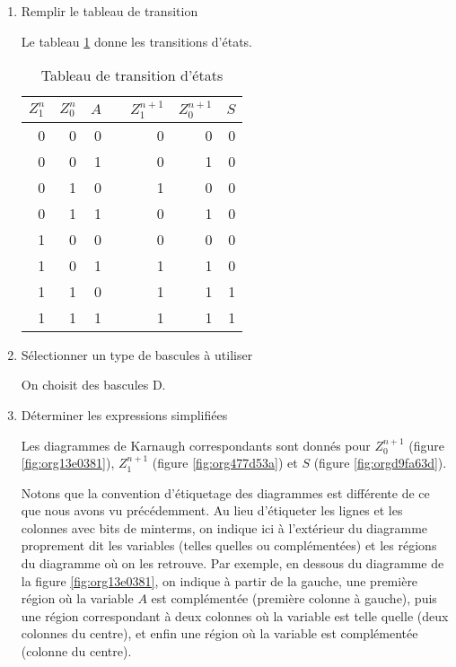 \documentclass[letter, oneside]{book}
\begin{document}
\begin{enumerate}
\begin{enumerate}
\item Remplir le tableau de transition
\label{sec:orgc6b1f28}

Le tableau \ref{tab:orgb36fc17} donne les transitions d'états. 

\begin{table}[htbp]
\caption{\label{tab:orgb36fc17}Tableau de transition d'états}
\centering
\begin{tabular}{rrrlrrr}
\(Z_1^n\) & \(Z_0^n\) & \(A\) &  & \(Z_1^{n+1}\) & \(Z_0^{n+1}\) & \(S\)\\[0pt]
\hline
0 & 0 & 0 &  & 0 & 0 & 0\\[0pt]
0 & 0 & 1 &  & 0 & 1 & 0\\[0pt]
0 & 1 & 0 &  & 1 & 0 & 0\\[0pt]
0 & 1 & 1 &  & 0 & 1 & 0\\[0pt]
1 & 0 & 0 &  & 0 & 0 & 0\\[0pt]
1 & 0 & 1 &  & 1 & 1 & 0\\[0pt]
1 & 1 & 0 &  & 1 & 1 & 1\\[0pt]
1 & 1 & 1 &  & 1 & 1 & 1\\[0pt]
\end{tabular}
\end{table}


\item Sélectionner un type de bascules à utiliser
\label{sec:orgd824560}

On choisit des bascules D. 

\item Déterminer les expressions simplifiées
\label{sec:org94bfe2b}

Les diagrammes de Karnaugh correspondants sont donnés pour
\(Z_0^{n+1}\) (figure \ref{fig:org13e0381}), \(Z_1^{n+1}\) (figure
\ref{fig:org477d53a}) et \(S\) (figure \ref{fig:orgd9fa63d}).  

Notons que la convention d'étiquetage des diagrammes est différente de
ce que nous avons vu précédemment.  Au lieu d'étiqueter les lignes et
les colonnes avec bits de minterms, on indique ici à l'extérieur du
diagramme proprement dit les variables (telles quelles ou
complémentées) et les régions du diagramme où on les retrouve. Par
exemple, en dessous du diagramme de la figure \ref{fig:org13e0381}, on
indique à partir de la gauche, une première région où la variable
\(A\) est complémentée (première colonne à gauche), puis une région
correspondant à deux colonnes où la variable est telle quelle (deux
colonnes du centre), et enfin une région où la variable est
complémentée (colonne du centre).


\end{enumerate}
\end{enumerate}
\end{document}
